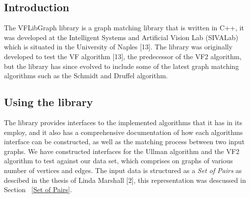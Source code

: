 \label{VFLibGraph Library}

\subsection{Introduction}
The VFLibGraph library is a graph matching library that is written in C++, it was developed at the Intelligent Systems and Artificial Vision Lab (SIVALab) which is situated in the University of Naples [13]. The library was originally developed to test the VF algorithm [13], the predecessor of the VF2 algorithm, but the library has since evolved to include some of the latest graph matching algorithms such as the Schmidt and Druffel algorithm.

\subsection{Using the library}
The library provides interfaces to the implemented algorithms that it has in its employ, and it also has a comprehensive documentation of how each algorithms interface can be constructed, as well as the matching process between two input graphs.\newline\newline
We have constructed interfaces for the Ullman algorithm and the VF2 algorithm to test against our data set, which comprises on graphs of various number of vertices and edges.
The input data is structured as a \textit{Set of Pairs} as descibed in the thesis of Linda Marshall [2], this representation was descussed in Section ~\ref{Set of Pairs}.
